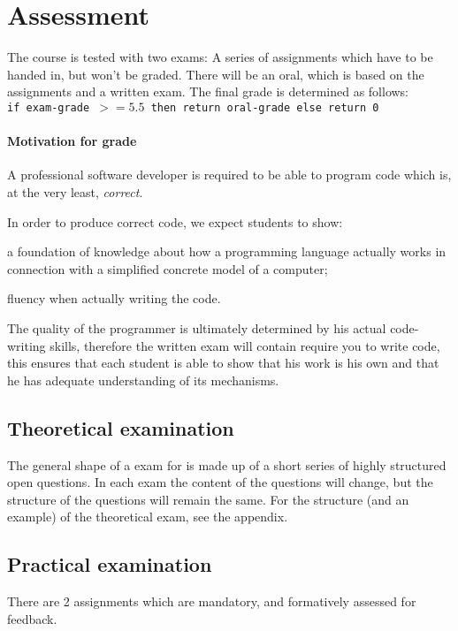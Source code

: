 \section{Assessment}
The course is tested with two exams:
A series of \glspl{assignment} which have to be handed in, but won't be graded. There will be an \gls{oral}, which is based on the \glspl{assignment}
and a written exam. The final grade is determined as follows: \\

\texttt{if \gls{exam}-grade $ >= 5.5 $ then return \gls{oral}-grade else return 0}

\paragraph*{Motivation for grade}
A professional software developer is required to be able to program code which is, at the very least, \textit{correct}.

In order to produce correct code, we expect students to show:
\begin{inparaenum}
\item a foundation of knowledge about how a programming language actually works in connection with a simplified concrete model of a computer;
\item fluency when actually writing the code.
\end{inparaenum}

The quality of the programmer is ultimately determined by his actual code-writing skills, therefore the written exam will contain require you to write code, this ensures that each student is able to show that his work is his own and that he has adequate understanding of its mechanisms.



\subsection{Theoretical examination \modulecode}
The general shape of a \gls{exam} for \texttt{\modulecode} is made up of a short series of highly structured open questions.
In each exam the content of the questions will change, but the structure of the questions will remain the same.
For the structure (and an example) of the theoretical exam, see the appendix.


\subsection{Practical examination \modulecode}
There are 2 \glspl{assignment} which are mandatory, and formatively assessed for \gls{feedback}.

